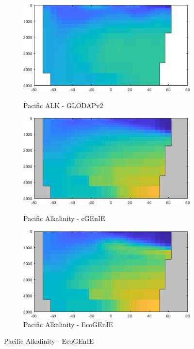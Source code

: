 \documentclass{article}
\begin{document}
\begin{figure}[htp]
\begin{subfigure}{.33\textwidth}
 \label{fig:nutrients2}
\end{subfigure}
\begin{subfigure}{.33\textwidth}
 \caption{Pacific ALK - GLODAPv2}
 \includegraphics[width=0.95\linewidth]{../Separate_figures/OBSERVATIONS/Pacific_TALK_profile.png}
 \label{fig:nutrients1}
\end{subfigure}%
\begin{subfigure}{.33\textwidth}
 \caption{Pacific Alkalinity - cGEnIE}
 \includegraphics[width=0.95\linewidth]{../Separate_figures/BIOGEM/Pacific_ocn_ALK_profile.png}
 \label{fig:nutrients1}
\end{subfigure}%
\begin{subfigure}{.33\textwidth}
 \caption{Pacific Alkalinity - EcoGEnIE}
 \includegraphics[width=0.95\linewidth]{../Separate_figures/ECOGEM/Pacific_ocn_ALK_profile.png}

\end{subfigure}
\end{figure}
\end{document}
